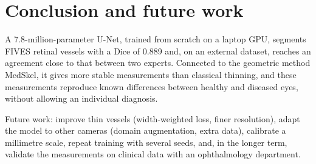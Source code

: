 \documentclass[11pt,a4paper]{article}
\begin{document}
\section{Conclusion and future work}
A 7.8-million-parameter U-Net, trained from scratch on a laptop GPU, segments FIVES retinal vessels with a Dice of 0.889 and, on an external dataset, reaches an agreement close to that between two experts. Connected to the geometric method MedSkel, it gives more stable measurements than classical thinning, and these measurements reproduce known differences between healthy and diseased eyes, without allowing an individual diagnosis.

Future work: improve thin vessels (width-weighted loss, finer resolution), adapt the model to other cameras (domain augmentation, extra data), calibrate a millimetre scale, repeat training with several seeds, and, in the longer term, validate the measurements on clinical data with an ophthalmology department.

\appendix
\end{document}

